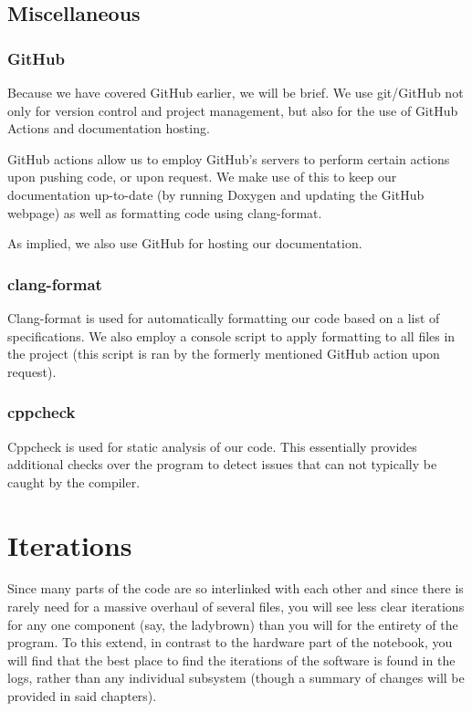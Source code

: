 \subsection{Miscellaneous}
\subsubsection{GitHub}
Because we have covered GitHub earlier, we will be brief. We use git/GitHub not only for version control and project management, but also for the use of GitHub Actions and documentation hosting. 

GitHub actions allow us to employ GitHub's servers to perform certain actions upon pushing code, or upon request. We make use of this to keep our documentation up-to-date (by running Doxygen and updating the GitHub webpage) as well as formatting code using clang-format.

As implied, we also use GitHub for hosting our documentation. 

\subsubsection{clang-format}
Clang-format \cite{bib:clangformat} is used for automatically formatting our code based on a list of specifications. We also employ a console script to apply formatting to all files in the project (this script is ran by the formerly mentioned GitHub action upon request). 

\subsubsection{cppcheck}
Cppcheck \cite{bib:cppcheck} is used for static analysis of our code. This essentially provides additional checks over the program to detect issues that can not typically be caught by the compiler. 

\section{Iterations}
Since many parts of the code are so interlinked with each other and since there is rarely need for a massive overhaul of several files, you will see less clear iterations for any one component (say, the ladybrown) than you will for the entirety of the program. To this extend, in contrast to the hardware part of the notebook, you will find that the best place to find the iterations of the software is found in the logs, rather than any individual subsystem (though a summary of changes will be provided in said chapters). 
